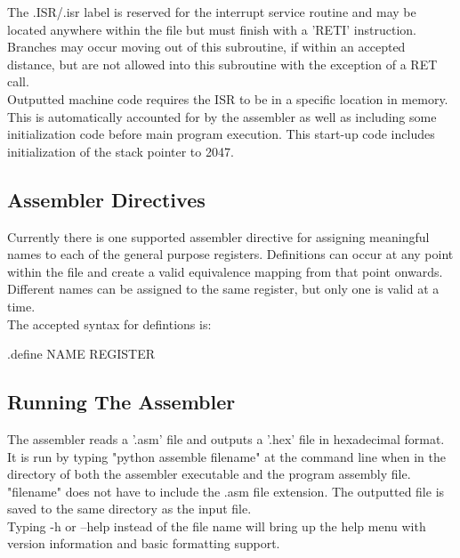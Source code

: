 \noindent The .ISR/.isr label is reserved for the interrupt service routine and may be located anywhere within the file but must finish with a 'RETI' instruction. Branches may occur moving out of this subroutine, if within an accepted distance, but are not allowed into this subroutine with the exception of a RET call. \\

\noindent Outputted machine code requires the ISR to be in a specific location in memory. This is automatically accounted for by the assembler as well as including some initialization code before main program execution. This start-up code includes initialization of the stack pointer to 2047. 

\subsection{Assembler Directives}
Currently there is one supported assembler directive for assigning meaningful names to each of the general purpose registers. Definitions can occur at any point within the file and create a valid equivalence mapping from that point onwards. Different names can be assigned to the same register, but only one is valid at a time. \\

\noindent The accepted syntax for defintions is:

\begin{center}.define NAME REGISTER\end{center}

\subsection{Running The Assembler}
The assembler reads a '.asm' file and outputs a '.hex' file in hexadecimal format. It is run by typing "python assemble filename" at the command line when in the directory of both the assembler executable and the program assembly file. "filename" does not have to include the .asm file extension. The outputted file is saved to the same directory as the input file. \\

\noindent Typing -h or --help instead of the file name will bring up the help menu with version information and basic formatting support. 

\newpage
